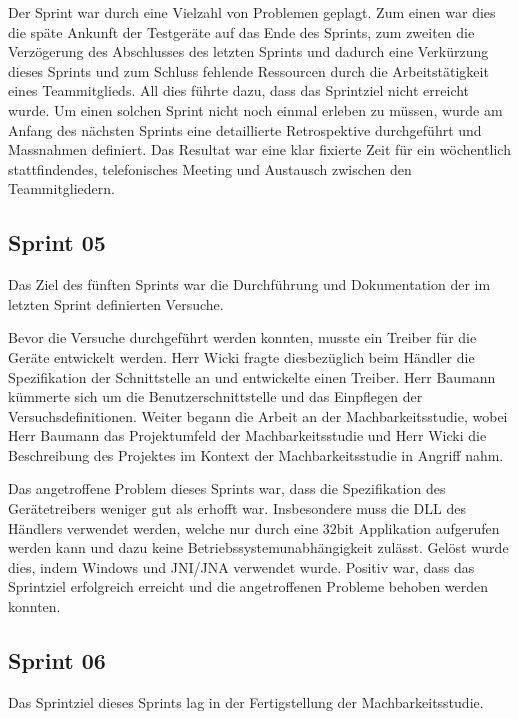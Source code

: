 Der Sprint war durch eine Vielzahl von Problemen geplagt. Zum einen war dies die späte Ankunft der Testgeräte auf das Ende des Sprints, zum zweiten die Verzögerung des Abschlusses des letzten Sprints und dadurch eine Verkürzung dieses Sprints und zum Schluss fehlende Ressourcen durch die Arbeitstätigkeit eines Teammitglieds. All dies führte dazu, dass das Sprintziel nicht erreicht wurde. Um einen solchen Sprint nicht noch einmal erleben zu müssen, wurde am Anfang des nächsten Sprints eine detaillierte Retrospektive durchgeführt und Massnahmen definiert. Das Resultat war eine klar fixierte Zeit für ein wöchentlich stattfindendes, telefonisches Meeting und Austausch zwischen den Teammitgliedern.

\subsection{Sprint 05}
Das Ziel des fünften Sprints war die Durchführung und Dokumentation der im letzten Sprint definierten Versuche.

Bevor die Versuche durchgeführt werden konnten, musste ein Treiber für die Geräte entwickelt werden. Herr Wicki fragte diesbezüglich beim Händler die Spezifikation der Schnittstelle an und entwickelte einen Treiber. Herr Baumann kümmerte sich um die Benutzerschnittstelle und das Einpflegen der Versuchsdefinitionen. Weiter begann die Arbeit an der Machbarkeitsstudie, wobei Herr Baumann das Projektumfeld der Machbarkeitsstudie und Herr Wicki die Beschreibung des Projektes im Kontext der Machbarkeitsstudie in Angriff nahm.

Das angetroffene Problem dieses Sprints war, dass die Spezifikation des Gerätetreibers weniger gut als erhofft war. Insbesondere muss die DLL des Händlers verwendet werden, welche nur durch eine 32bit Applikation aufgerufen werden kann und dazu keine Betriebssystemunabhängigkeit zulässt. Gelöst wurde dies, indem Windows und JNI/JNA verwendet wurde. Positiv war, dass das Sprintziel erfolgreich erreicht und die angetroffenen Probleme behoben werden konnten.

\subsection{Sprint 06}
Das Sprintziel dieses Sprints lag in der Fertigstellung der Machbarkeitsstudie.

